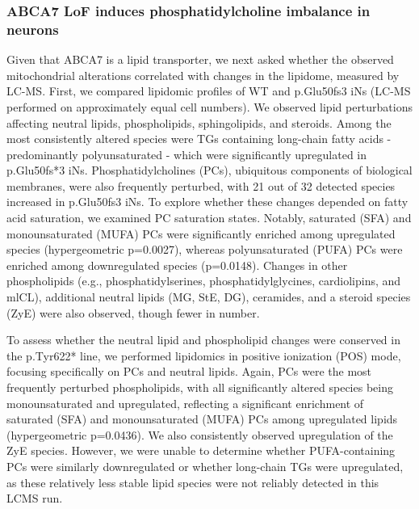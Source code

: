 \subsubsection{ABCA7 LoF induces phosphatidylcholine imbalance in neurons}
Given that ABCA7 is a lipid transporter, we next asked whether the observed mitochondrial alterations correlated with changes in the lipidome, measured by LC-MS. First, we compared lipidomic profiles of WT and p.Glu50fs3 iNs (LC-MS performed on approximately equal cell numbers). We observed lipid perturbations affecting neutral lipids, phospholipids, sphingolipids, and steroids. Among the most consistently altered species were TGs containing long-chain fatty acids - predominantly polyunsaturated - which were significantly upregulated in p.Glu50fs*3 iNs. Phosphatidylcholines (PCs), ubiquitous components of biological membranes, were also frequently perturbed, with 21 out of 32 detected species increased in p.Glu50fs3 iNs. To explore whether these changes depended on fatty acid saturation, we examined PC saturation states. Notably, saturated (SFA) and monounsaturated (MUFA) PCs were significantly enriched among upregulated species (hypergeometric p=0.0027), whereas polyunsaturated (PUFA) PCs were enriched among downregulated species (p=0.0148). Changes in other phospholipids (e.g., phosphatidylserines, phosphatidylglycines, cardiolipins, and mlCL), additional neutral lipids (MG, StE, DG), ceramides, and a steroid species (ZyE) were also observed, though fewer in number.

To assess whether the neutral lipid and phospholipid changes were conserved in the p.Tyr622* line, we performed lipidomics in positive ionization (POS) mode, focusing specifically on PCs and neutral lipids. Again, PCs were the most frequently perturbed phospholipids, with all significantly altered species being monounsaturated and upregulated, reflecting a significant enrichment of saturated (SFA) and monounsaturated (MUFA) PCs among upregulated lipids (hypergeometric p=0.0436). We also consistently observed upregulation of the ZyE species. However, we were unable to determine whether PUFA-containing PCs were similarly downregulated or whether long-chain TGs were upregulated, as these relatively less stable lipid species were not reliably detected in this LCMS run.

